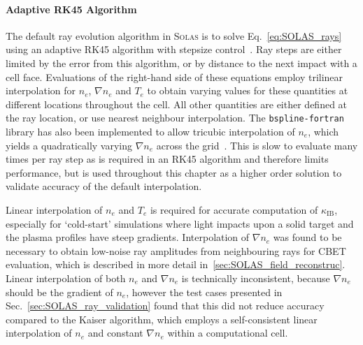 \paragraph*{Adaptive RK45 Algorithm}
The default ray evolution algorithm in \textsc{Solas} is to solve Eq.~\ref{eq:SOLAS_rays} using an adaptive RK45 algorithm with stepsize control~\cite{press_numerical_2007}.
Ray steps are either limited by the error from this algorithm, or by distance to the next impact with a cell face.
Evaluations of the right-hand side of these equations employ trilinear interpolation for $n_e$, $\nabla n_e$ and $T_e$ to obtain varying values for these quantities at different locations throughout the cell.
All other quantities are either defined at the ray location, or use nearest neighbour interpolation.
The \texttt{bspline-fortran} library has also been implemented to allow tricubic interpolation of $n_e$, which yields a quadratically varying $\nabla n_e$ across the grid~\cite{williams_bspline-fortran_2024}.
This is slow to evaluate many times per ray step as is required in an RK45 algorithm and therefore limits performance, but is used throughout this chapter as a higher order solution to validate accuracy of the default interpolation.

Linear interpolation of $n_e$ and $T_e$ is required for accurate computation of $\kappa_{\text{IB}}$, especially for `cold-start' simulations where light impacts upon a solid target and the plasma profiles have steep gradients.
Interpolation of $\nabla n_e$ was found to be necessary to obtain low-noise ray amplitudes from neighbouring rays for \ac{CBET} evaluation, which is described in more detail in~\ref{sec:SOLAS_field_reconstruc}.
Linear interpolation of both $n_e$ and $\nabla n_e$ is technically inconsistent, because $\nabla n_e$ should be the gradient of $n_e$, however the test cases presented in Sec.~\ref{sec:SOLAS_ray_validation} found that this did not reduce accuracy compared to the Kaiser algorithm, which employs a self-consistent linear interpolation of $n_e$ and constant $\nabla n_e$ within a computational cell.

